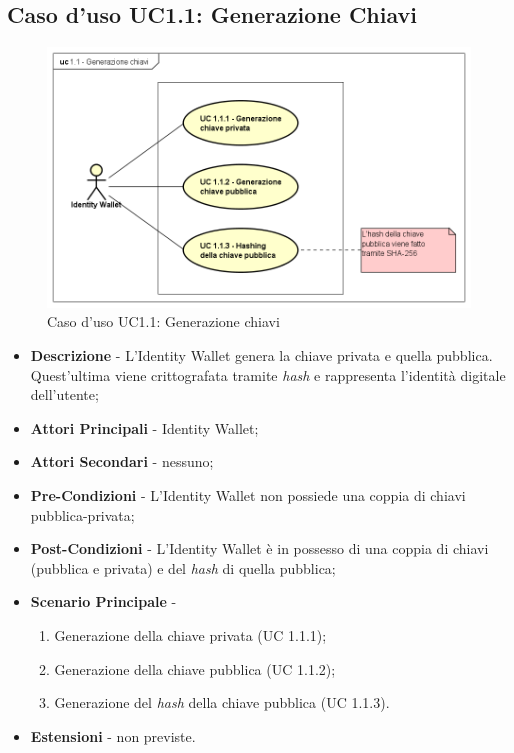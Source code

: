 \subsection{Caso d'uso UC1.1: Generazione Chiavi}
\begin{figure}[h]
	\centering
	\includegraphics[scale=0.50]{immagini/usecase/UC11_GenerazioneChiavi}
	\caption{Caso d'uso UC1.1: Generazione chiavi}
\end{figure}
\begin{itemize}
	\item \textbf{Descrizione} - L'Identity Wallet genera la chiave privata e quella pubblica. Quest'ultima viene crittografata tramite \textit{hash} e rappresenta l'identità digitale dell'utente;
	\item \textbf{Attori Principali} - Identity Wallet;
	\item \textbf{Attori Secondari} - nessuno;
	\item \textbf{Pre-Condizioni} - L'Identity Wallet non possiede una coppia di chiavi pubblica-privata;
	\item \textbf{Post-Condizioni} - L'Identity Wallet è in possesso di una coppia di chiavi (pubblica e privata) e del \textit{hash} di quella pubblica;
	\item \textbf{Scenario Principale} -
	\begin{enumerate}
		\item Generazione della chiave privata (UC 1.1.1);
		\item Generazione della chiave pubblica (UC 1.1.2);
		\item Generazione del \textit{hash} della chiave pubblica (UC 1.1.3).
	\end{enumerate}
	\item \textbf{Estensioni} - non previste.
\end{itemize}
\newpage
